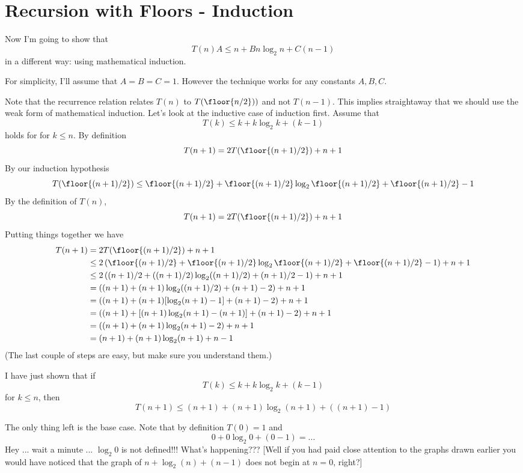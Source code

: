 \section{Recursion with Floors - Induction}

Now I'm going to show that 
\[
T(n) A\leq n + B n \log_2 n + C(n - 1)
\]
in a different way: using mathematical induction.

For simplicity, I'll assume that $A = B = C = 1$.
However the technique works for any constants $A, B, C$.

Note that the recurrence relation relates $T(n)$ to $T(\floor{n/2}))$
and not $T(n - 1)$.
This implies straightaway that we should use the weak form 
of mathematical induction.
Let's look at the inductive case of induction first.
Assume that
\[
T(k) \leq k + k \log_2 k + (k - 1)
\]
holds for for $k \leq n$.
By definition
\[
T(n + 1) = 2 T(\floor{(n+1)/2}) + n + 1
\]
By our induction hypothesis
\[
T(\floor{(n+1)/2}) 
\leq 
\floor{(n+1)/2}
+ \floor{(n+1)/2} \log_2 \floor{(n+1)/2} 
+ \floor{(n+1)/2} - 1
\]
By the definition of $T(n)$,
\[
T(n + 1) = 2 T(\floor{(n+1)/2}) + n + 1
\]
Putting things together we have
\begin{align*}
T(n + 1) 
&= 2 T(\floor{(n+1)/2}) + n + 1 \\
&\leq 2 
   \left( 
\floor{(n+1)/2}
+ \floor{(n+1)/2} \log_2 \floor{(n+1)/2} 
+ \floor{(n+1)/2} - 1       
   \right)
   + n + 1 \\
&\leq 2 
   \left( 
   (n+1)/2
+ ((n+1)/2) \log_2 ((n+1)/2) 
+ (n+1)/2 - 1       
   \right)
   + n + 1 \\
&= \left( 
   (n+1)
+ (n+1) \log_2 ((n+1)/2) 
+ (n+1) - 2       
   \right)
   + n + 1 \\
&= \left( 
   (n+1)
+ (n+1) [\log_2 (n+1) - 1]
+ (n+1) - 2       
   \right)
   + n + 1 \\
&= \left( 
   (n+1)
+ [(n+1)\log_2 (n+1) - (n+1)]
+ (n+1) - 2       
   \right)
   + n + 1 \\
&= \left( 
   (n+1)
+ (n+1)\log_2 (n+1)
 - 2       
   \right)
   + n + 1 \\
&= (n+1)
+ (n+1)\log_2 (n+1)   
   + n - 1 \\
\end{align*}
(The last couple of steps are easy, but make sure you understand them.)

I have just shown that if 
\[
T(k) \leq k + k \log_2 k + (k - 1)
\]
for $k \leq n$, then
\[
T(n+1) \leq (n+1) + (n+1) \log_2 (n+1) + ((n+1) - 1)
\]

The only thing left is the base case.
Note that by definition $T(0) = 1$
and 
\[
0 + 0 \log_2 0 + (0 - 1) = ...
\]
Hey ... wait a minute ... $\log_2 0$ is not defined!!!
What's happening???
[Well if you had paid close attention to the graphs drawn earlier you  
would have noticed that the graph of $n + \log_2(n) + (n - 1)$
does not begin at $n = 0$, right?]

